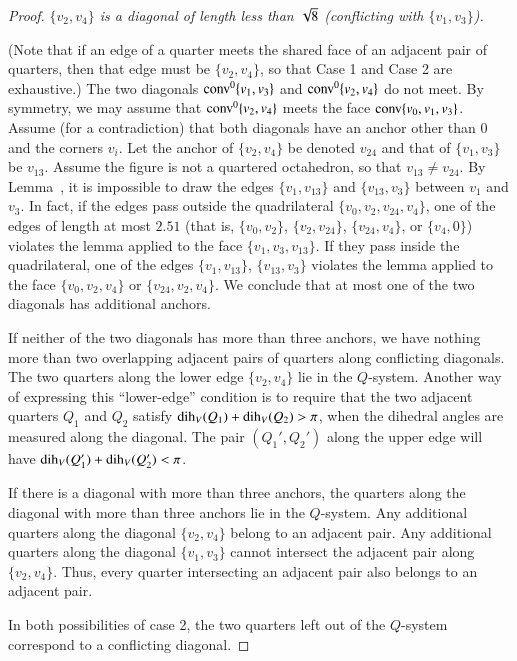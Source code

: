 \begin{proof}
  {\it $\{v_2,v_4\}$ is a diagonal of
length less than $\sqrt8$ (conflicting with $\{v_1,v_3\}$).}

(Note that if an edge of a quarter meets the shared face
of an adjacent pair of quarters, then that edge must be
$\{v_2,v_4\}$, so that Case 1 and Case 2 are exhaustive.) The two
diagonals ${\operatorname{conv}}^0\{v_1,v_3\}$ and ${\operatorname{conv}}^0\{v_2,v_4\}$ 
do not meet. By
symmetry, we may assume that ${\operatorname{conv}}^0\{v_2,v_4\}$ meets the face
${\operatorname{conv}}\{v_0,v_1,v_3\}$. Assume (for a contradiction) that both diagonals
have an anchor other than $0$ and the corners $v_i$. Let the
anchor of $\{v_2,v_4\}$ be denoted $v_{24}$ and that of
$\{v_1,v_3\}$ be $v_{13}$. Assume the figure is not a quartered
octahedron, so that $v_{13}\ne v_{24}$. By
Lemma~, it is impossible to
draw the edges $\{v_1,v_{13}\}$ and $\{v_{13},v_3\}$ between $v_1$
and $v_3$.  In fact, if the edges pass outside the quadrilateral
$\{v_0,v_2,v_{24},v_4\}$, one of the edges of length at most $2.51$
(that is,
    $\{v_0,v_2\}$, $\{v_2,v_{24}\}$, $\{v_{24},v_4\}$,
or $\{v_4,0\}$) violates the lemma applied to the face
$\{v_1,v_3,v_{13}\}$. If they pass inside the quadrilateral, one
of the edges $\{v_1,v_{13}\}$, $\{v_{13},v_3\}$ violates the lemma
applied to the face
    $\{v_0,v_{2},v_4\}$ or $\{v_{24},v_2,v_4\}$.
We conclude that at most one of the two diagonals has additional
anchors.

If neither of the two diagonals has more than three anchors, we
have nothing more than two overlapping adjacent pairs of quarters
along conflicting diagonals.  The two quarters along the lower
edge $\{v_2,v_4\}$ lie in the $Q$-system.  Another way of
expressing this ``lower-edge'' condition is to require that the
two adjacent quarters $Q_1$ and $Q_2$ satisfy
$\operatorname{dih}_V(Q_1)+\operatorname{dih}_V(Q_2)>\pi$, when the dihedral angles are measured
along the diagonal. The pair $(Q_1',Q_2')$ along the upper edge
will have $\operatorname{dih}_V(Q_1')+\operatorname{dih}_V(Q_2')<\pi$.

If there is a diagonal with more than three anchors,  the quarters
along the diagonal with more than three anchors lie in the
$Q$-system.  Any additional quarters along the diagonal
$\{v_2,v_4\}$ belong to an adjacent pair. Any additional quarters
along the diagonal $\{v_1,v_3\}$ cannot intersect the adjacent
pair along $\{v_2,v_4\}$.  Thus, every quarter intersecting an
adjacent pair also belongs to an adjacent pair.

In both possibilities of case 2, the two quarters left out of the
$Q$-system correspond to a conflicting diagonal.
\end{proof}

